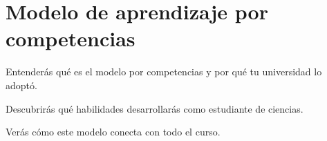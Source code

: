 \chapter{Modelo de aprendizaje por competencias}
\label{cha:modeloporcompetencias}

\begin{enestecapitulo}
	\item[\emoji{dart}] Entenderás qué es el modelo por competencias y por qué tu universidad lo adoptó.
	\item[\emoji{student}] Descubrirás qué habilidades desarrollarás como estudiante de ciencias.
	\item[\emoji{link}] Verás cómo este modelo conecta con todo el curso.
\end{enestecapitulo}
